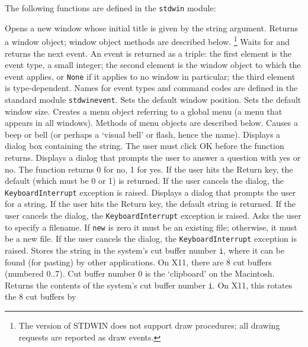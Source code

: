 The following functions are defined in the {\tt stdwin} module:
\begin{description}
Opens a new window whose initial title is given by the string argument.
Returns a window object; window object methods are described below.%
\footnote{
The {\Python} version of STDWIN does not support draw procedures; all
drawing requests are reported as draw events.
}
Waits for and returns the next event.
An event is returned as a triple: the first element is the event
type, a small integer; the second element is the window object to which
the event applies, or
{\tt None}
if it applies to no window in particular;
the third element is type-dependent.
Names for event types and command codes are defined in the standard
module
{\tt stdwinevent}.
Sets the default window position.
Sets the default window size.
Creates a menu object referring to a global menu (a menu that appears in
all windows).
Methods of menu objects are described below.
Causes a beep or bell (or perhaps a `visual bell' or flash, hence the
name).
Displays a dialog box containing the string.
The user must click OK before the function returns.
Displays a dialog that prompts the user to answer a question with yes or
no.
The function returns 0 for no, 1 for yes.
If the user hits the Return key, the default (which must be 0 or 1) is
returned.
If the user cancels the dialog, the
{\tt KeyboardInterrupt}
exception is raised.
Displays a dialog that prompts the user for a string.
If the user hits the Return key, the default string is returned.
If the user cancels the dialog, the
{\tt KeyboardInterrupt}
exception is raised.
Asks the user to specify a filename.
If
{\tt new}
is zero it must be an existing file; otherwise, it must be a new file.
If the user cancels the dialog, the
{\tt KeyboardInterrupt}
exception is raised.
Stores the string in the system's cut buffer number
{\tt i},
where it can be found (for pasting) by other applications.
On X11, there are 8 cut buffers (numbered 0..7).
Cut buffer number 0 is the `clipboard' on the Macintosh.
Returns the contents of the system's cut buffer number
{\tt i}.
On X11, this rotates the 8 cut buffers by

\end{description}
